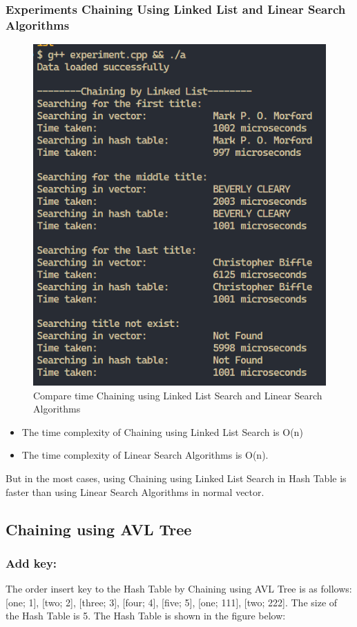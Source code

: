 \subsubsection{Experiments Chaining Using Linked List and Linear Search Algorithms}
\begin{figure}[H]
	\centering
	\includegraphics[width=0.7\linewidth]{img/ChainingLinkedList/compare.PNG}
	\caption{Compare time Chaining using Linked List Search and Linear Search Algorithms}
\end{figure}

\begin{itemize}
	\item The time complexity of Chaining using Linked List Search is O(n)
	\item The time complexity of Linear Search Algorithms is O(n).
\end{itemize}
But in the most cases, using Chaining using Linked List Search in Hash Table is faster than using Linear Search Algorithms in normal vector.

\pagebreak
\subsection{Chaining using AVL Tree}
\subsubsection{Add key:}
The order insert key to the Hash Table by Chaining using AVL Tree is as follows: [one; 1], [two; 2], [three; 3], [four; 4], [five; 5], [one; 111], [two; 222]. The size of the Hash Table is 5. The Hash Table is shown in the figure below:


